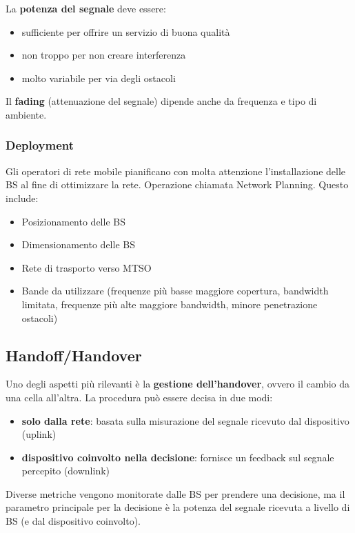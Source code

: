 La \textbf{potenza del segnale} deve essere: 
\begin{itemize}
	\item sufficiente per offrire un servizio di buona qualità
	\item non troppo per non creare interferenza
	\item molto variabile per via degli ostacoli
\end{itemize}

Il \textbf{fading} (attenuazione del segnale) dipende anche da frequenza e tipo di ambiente.\\

\subsubsection{Deployment}

Gli operatori di rete mobile pianificano con molta attenzione l'installazione delle BS al fine di ottimizzare la rete. Operazione chiamata Network Planning. Questo include:
\begin{itemize}
	\item Posizionamento delle BS
	\item Dimensionamento delle BS
	\item Rete di trasporto verso MTSO
	\item Bande da utilizzare (frequenze più basse maggiore copertura, bandwidth limitata, frequenze più alte maggiore bandwidth, minore penetrazione ostacoli)
\end{itemize}

\newpage

\subsection{Handoff/Handover}

Uno degli aspetti più rilevanti è la \textbf{gestione dell'handover}, ovvero il cambio da una cella all'altra. La procedura può essere decisa in due modi:
\begin{itemize}
	\item \textbf{solo dalla rete}: basata sulla misurazione del segnale ricevuto dal dispositivo (uplink)
	\item \textbf{dispositivo coinvolto nella decisione}: fornisce un feedback sul segnale percepito (downlink)
\end{itemize}
Diverse metriche vengono monitorate dalle BS per prendere una decisione, ma il parametro principale per la decisione è la potenza del segnale ricevuta a livello di BS (e dal dispositivo coinvolto).\\

